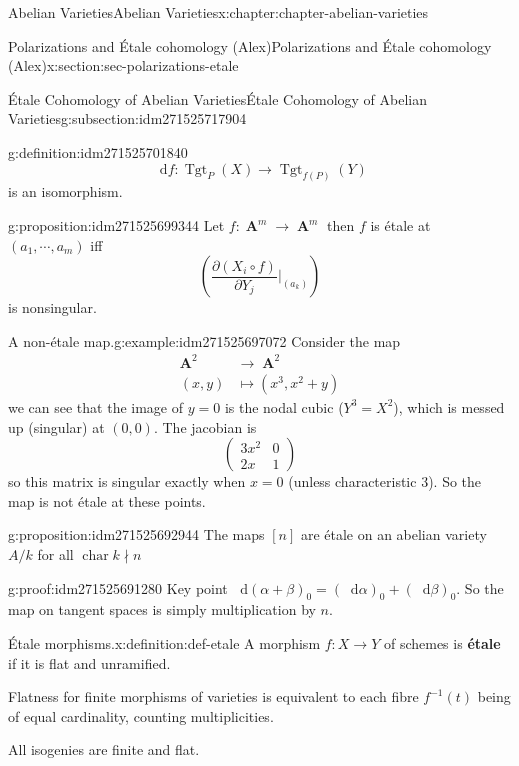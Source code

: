 \documentclass[oneside,10pt,]{book}
\newcommand{\terminology}[1]{\textbf{#1}}
\numberwithin{equation}{section}
\newcommand{\diff}{\mathop{}\!\mathrm{d}}
\newcommand{\lb}{[}
\newcommand{\rb}{]}
\DeclareMathOperator{\Tgt}{Tgt}
\DeclareMathOperator{\characteristic}{char}
\DeclareMathOperator{\aff}{\mathbf{A}}
\newcommand{\amp}{&}
\begin{document}
\begin{chapterptx}{Abelian Varieties}{}{Abelian Varieties}{}{}{x:chapter:chapter-abelian-varieties}
\begin{sectionptx}{Polarizations and Étale cohomology (Alex)}{}{Polarizations and Étale cohomology (Alex)}{}{}{x:section:sec-polarizations-etale}
\begin{subsectionptx}{Étale Cohomology of Abelian Varieties}{}{Étale Cohomology of Abelian Varieties}{}{}{g:subsection:idm271525717904}
\begin{definition}{}{g:definition:idm271525701840}
\begin{equation*}
\diff f\colon\Tgt_{P}(X) \to \Tgt_{f(P)} (Y)
\end{equation*}
is an isomorphism.%
\end{definition}
\begin{proposition}{}{}{g:proposition:idm271525699344}%
Let \(f \colon \aff^m\to \aff^m\) then \(f\) is étale at \((a_1, \cdots, a_m)\) iff%
\begin{equation*}
\left(\frac{\partial(X_i \circ f)}{\partial Y_j}|_{(a_k)} \right)
\end{equation*}
is nonsingular.%
\end{proposition}
\begin{example}{A non-étale map.}{g:example:idm271525697072}%
Consider the map%
\begin{align*}
\aff^2 \amp\to \aff^2\\
(x,y) \amp\mapsto (x^3, x^2 + y)
\end{align*}
we can see that the image of \(y= 0\) is the nodal cubic (\(Y^3 = X^2\)), which is messed up (singular) at \((0,0)\). The jacobian is%
\begin{equation*}
\begin{pmatrix} 3x^2 \amp 0 \\ 2x \amp 1\end{pmatrix}
\end{equation*}
so this matrix is singular exactly when \(x= 0\) (unless characteristic 3). So the map is not étale at these points.%
\end{example}
\begin{proposition}{}{}{g:proposition:idm271525692944}%
The maps \(\lb n\rb\) are étale on an abelian variety \(A/k\) for all  \(\characteristic{k} \nmid n\)%
\end{proposition}
\begin{proofptx}{}{g:proof:idm271525691280}
Key point \(\diff (\alpha+ \beta)_0 = (\diff \alpha )_0 + (\diff \beta)_0\). So the map on tangent spaces is simply multiplication by \(n\).%
\end{proofptx}
\begin{definition}{Étale morphisms.}{x:definition:def-etale}%
A morphism \(f\colon X\to Y\) of schemes is \terminology{étale} if it is flat and unramified.%
\par
Flatness for finite morphisms of varieties is equivalent to each fibre \(f^{-1}(t)\) being of equal cardinality, counting multiplicities.%
\end{definition}
All isogenies are finite and flat.%

\end{subsectionptx}
\end{sectionptx}
\end{chapterptx}
\end{document}
